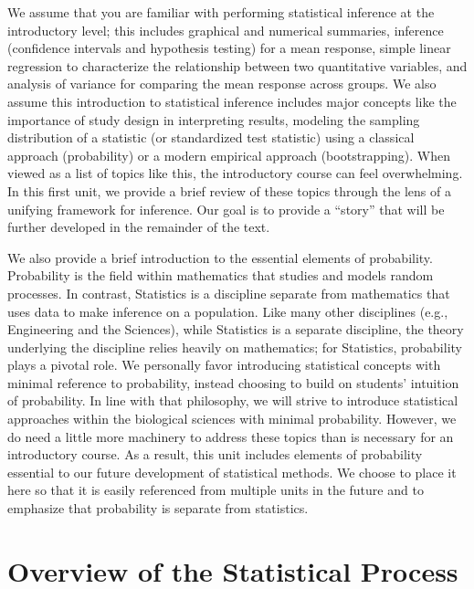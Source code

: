 \documentclass[
  letterpaper,
  DIV=11,
  numbers=noendperiod]{scrreprt}
\theoremstyle{definition}
\theoremstyle{definition}
\theoremstyle{remark}
\begin{document}
We assume that you are familiar with performing statistical inference at
the introductory level; this includes graphical and numerical summaries,
inference (confidence intervals and hypothesis testing) for a mean
response, simple linear regression to characterize the relationship
between two quantitative variables, and analysis of variance for
comparing the mean response across groups. We also assume this
introduction to statistical inference includes major concepts like the
importance of study design in interpreting results, modeling the
sampling distribution of a statistic (or standardized test statistic)
using a classical approach (probability) or a modern empirical approach
(bootstrapping). When viewed as a list of topics like this, the
introductory course can feel overwhelming. In this first unit, we
provide a brief review of these topics through the lens of a unifying
framework for inference. Our goal is to provide a ``story'' that will be
further developed in the remainder of the text.

We also provide a brief introduction to the essential elements of
probability. Probability is the field within mathematics that studies
and models random processes. In contrast, Statistics is a discipline
separate from mathematics that uses data to make inference on a
population. Like many other disciplines (e.g., Engineering and the
Sciences), while Statistics is a separate discipline, the theory
underlying the discipline relies heavily on mathematics; for Statistics,
probability plays a pivotal role. We personally favor introducing
statistical concepts with minimal reference to probability, instead
choosing to build on students' intuition of probability. In line with
that philosophy, we will strive to introduce statistical approaches
within the biological sciences with minimal probability. However, we do
need a little more machinery to address these topics than is necessary
for an introductory course. As a result, this unit includes elements of
probability essential to our future development of statistical methods.
We choose to place it here so that it is easily referenced from multiple
units in the future and to emphasize that probability is separate from
statistics.

\hypertarget{sec-statistical-process}{%
\chapter{Overview of the Statistical
Process}\label{sec-statistical-process}}

\providecommand{\norm}[1]{\left\lVert#1\right\rVert}
\providecommand{\abs}[1]{\left\lvert#1\right\rvert}
\providecommand{\dist}[1]{\stackrel{\text{#1}}{\sim}}
\providecommand{\ind}[1]{\mathbb{I}\left(#1\right)}
\providecommand{\bm}[1]{\mathbf{#1}}
\providecommand{\bs}[1]{\boldsymbol{#1}}
\providecommand{\Ell}{\mathcal{L}}
\providecommand{\indep}{\perp\negthickspace\negmedspace\perp}
\end{document}
